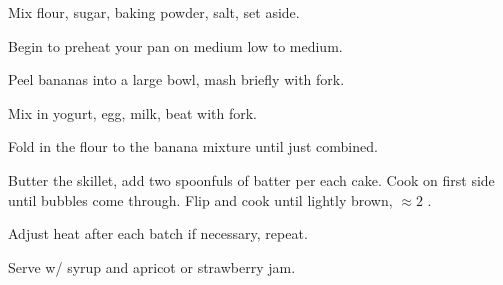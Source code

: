 \begin{preparation}
\item Mix flour, sugar, baking powder, salt, set aside.

\item Begin to preheat your pan on medium low to medium.

\item Peel bananas into a large bowl, mash briefly with fork.

\item Mix in yogurt, egg, milk, beat with fork.

\item Fold in the flour to the banana mixture until just combined.

\item Butter the skillet, add two spoonfuls of batter per each cake.
	Cook on first side until bubbles come through.
	Flip and cook until lightly brown, $\approx2$ \minute.

\item Adjust heat after each batch if necessary, repeat.

\item Serve w/ syrup and apricot or strawberry jam.
\end{preparation}


\recipeend%
